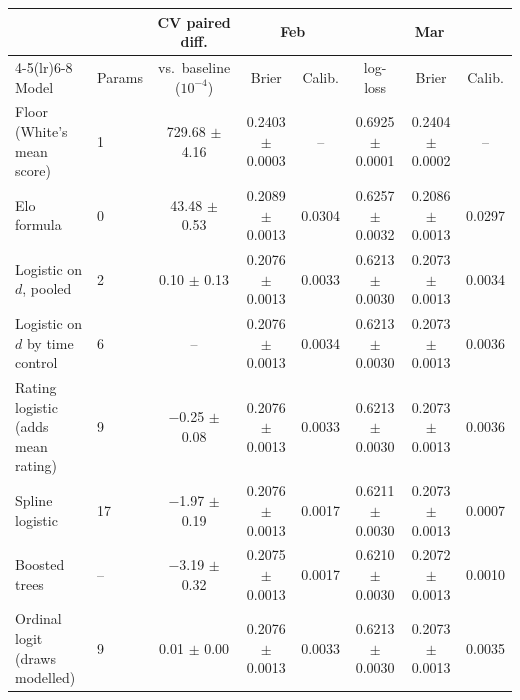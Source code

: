 \begin{tabular}{llcccccc}
\toprule
 & & CV paired diff. & \multicolumn{2}{c}{Feb} & \multicolumn{3}{c}{Mar} \\
\cmidrule(lr){4-5}\cmidrule(lr){6-8}
Model & Params & vs.\ baseline ($10^{-4}$) & Brier & Calib. & log-loss & Brier & Calib. \\
\midrule
Floor (White's mean score) & 1 & 729.68 $\pm$ 4.16 & 0.2403 $\pm$ 0.0003 & -- & 0.6925 $\pm$ 0.0001 & 0.2404 $\pm$ 0.0002 & -- \\
Elo formula & 0 & 43.48 $\pm$ 0.53 & 0.2089 $\pm$ 0.0013 & 0.0304 & 0.6257 $\pm$ 0.0032 & 0.2086 $\pm$ 0.0013 & 0.0297 \\
Logistic on $d$, pooled & 2 & 0.10 $\pm$ 0.13 & 0.2076 $\pm$ 0.0013 & 0.0033 & 0.6213 $\pm$ 0.0030 & 0.2073 $\pm$ 0.0013 & 0.0034 \\
Logistic on $d$ by time control & 6 & -- & 0.2076 $\pm$ 0.0013 & 0.0034 & 0.6213 $\pm$ 0.0030 & 0.2073 $\pm$ 0.0013 & 0.0036 \\
Rating logistic (adds mean rating) & 9 & $-$0.25 $\pm$ 0.08 & 0.2076 $\pm$ 0.0013 & 0.0033 & 0.6213 $\pm$ 0.0030 & 0.2073 $\pm$ 0.0013 & 0.0036 \\
Spline logistic & 17 & $-$1.97 $\pm$ 0.19 & 0.2076 $\pm$ 0.0013 & 0.0017 & 0.6211 $\pm$ 0.0030 & 0.2073 $\pm$ 0.0013 & 0.0007 \\
Boosted trees & -- & $-$3.19 $\pm$ 0.32 & 0.2075 $\pm$ 0.0013 & 0.0017 & 0.6210 $\pm$ 0.0030 & 0.2072 $\pm$ 0.0013 & 0.0010 \\
Ordinal logit (draws modelled) & 9 & 0.01 $\pm$ 0.00 & 0.2076 $\pm$ 0.0013 & 0.0033 & 0.6213 $\pm$ 0.0030 & 0.2073 $\pm$ 0.0013 & 0.0035 \\
\bottomrule
\end{tabular}
